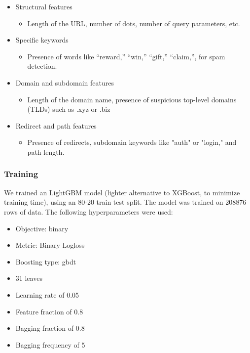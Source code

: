 \documentclass{article}
\begin{document}
\begin{itemize}
    \item Structural features
        \begin{itemize}
        \item Length of the URL, number of dots, number of query parameters, etc.
        \end{itemize}
    \item Specific keywords
        \begin{itemize}
        \item Presence of words like “reward,” “win,” “gift,” “claim,”, for spam detection.
        \end{itemize}
    \item Domain and subdomain features
        \begin{itemize}
        \item Length of the domain name, presence of suspicious top-level domains (TLDs) such as .xyz or .biz
        \end{itemize}
    \item Redirect and path features
        \begin{itemize}
            \item Presence of redirects, subdomain keywords like "auth" or "login," and path length.
        \end{itemize}
\end{itemize}

\subsubsection*{Training}

\noindent
We trained an LightGBM model (lighter alternative to XGBoost, to minimize training time), using an 80-20 train test split. The model was trained on 208876 rows of data. The following hyperparameters were used: 

\begin{itemize}
    \item Objective: binary
    \item Metric: Binary Logloss
    \item Boosting type: gbdt
    \item 31 leaves
    \item Learning rate of 0.05
    \item Feature fraction of 0.8
    \item Bagging fraction of 0.8
    \item Bagging frequency of 5
\end{itemize}
\end{document}
